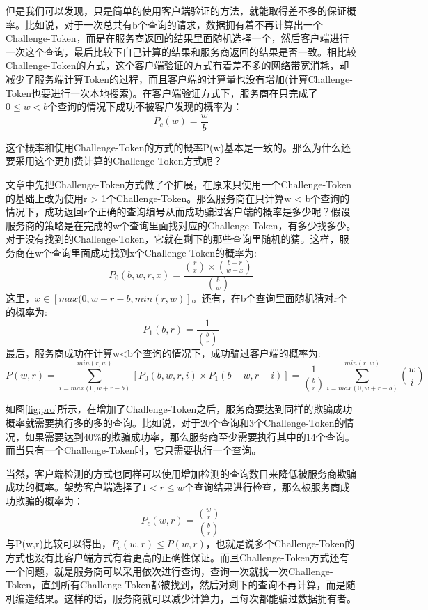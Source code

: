 但是我们可以发现，只是简单的使用客户端验证的方法，就能取得差不多的保证概率。比如说，对于一次总共有b个查询的请求，数据拥有着不再计算出一个Challenge-Token，而是在服务商返回的结果里面随机选择一个，然后客户端进行一次这个查询，最后比较下自己计算的结果和服务商返回的结果是否一致。相比较Challenge-Token的方式，这个客户端验证的方式有着差不多的网络带宽消耗，却减少了服务端计算Token的过程，而且客户端的计算量也没有增加(计算Challenge-Token也要进行一次本地搜索)。在客户端验证方式下，服务商在只完成了$0 \le w < b$个查询的情况下成功不被客户发现的概率为：
\begin{equation} P_c(w) = \frac{w}{b} \end{equation}

这个概率和使用Challenge-Token的方式的概率P(w)基本是一致的。那么为什么还要采用这个更加费计算的Challenge-Token方式呢？

文章中先把Challenge-Token方式做了个扩展，在原来只使用一个Challenge-Token的基础上改为使用r > 1个Challenge-Token。那么服务商在只计算w < b个查询的情况下，成功返回r个正确的查询编号从而成功骗过客户端的概率是多少呢？假设服务商的策略是在完成的w个查询里面找对应的Challenge-Token，有多少找多少。对于没有找到的Challenge-Token，它就在剩下的那些查询里随机的猜。这样，服务商在w个查询里面成功找到x个Challenge-Token的概率为:
\begin{equation} P_0(b, w, r, x) = \frac{\binom{r}{x} \times \binom{b-r}{w-x}}{\binom{b}{w}} \end{equation}
这里，$x \in [max(0, w+r-b, min(r,w)]$。还有，在b个查询里面随机猜对r个的概率为:
\begin{equation} P_1(b,r) = \frac{1}{\binom{b}{r}} \end{equation}
最后，服务商成功在计算w<b个查询的情况下，成功骗过客户端的概率为:
\begin{equation} P(w,r) = \sum_{i=max(0,w+r-b)}^{min(r,w)} [P_0(b,w,r,i) \times P_1(b-w,r-i)] = \frac{1}{\binom{b}{r}}\sum_{i=max(0,w+r-b)}^{min(r,w)}\binom{w}{i} \end{equation}

如图\ref{fig:pro}所示，在增加了Challenge-Token之后，服务商要达到同样的欺骗成功概率就需要执行多的多的查询。比如说，对于20个查询和3个Challenge-Token的情况，如果需要达到40\%的欺骗成功率，那么服务商至少需要执行其中的14个查询。而当只有一个Challenge-Token时，它只需要执行一个查询。

当然，客户端检测的方式也同样可以使用增加检测的查询数目来降低被服务商欺骗成功的概率。架势客户端选择了$1 < r \le w$个查询结果进行检查，那么被服务商成功欺骗的概率为：
\begin{equation} P_c(w,r) = \frac{\binom{w}{r}}{\binom{b}{r}} \end{equation}
与P(w,r)比较可以得出，$P_c(w,r) \le P(w,r)$，也就是说多个Challenge-Token的方式也没有比客户端方式有着更高的正确性保证。而且Challenge-Token方式还有一个问题，就是服务商可以采用依次进行查询，查询一次就找一次Challenge-Token，直到所有Challenge-Token都被找到，然后对剩下的查询不再计算，而是随机编造结果。这样的话，服务商就可以减少计算力，且每次都能骗过数据拥有者。

